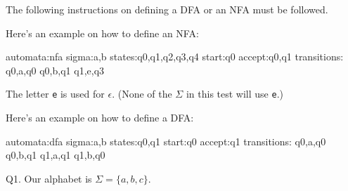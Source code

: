 



\renewcommand\TITLE{Test 1 Part A}

\renewcommand\AUTHOR{John Doe}
\renewcommand\EMAIL{jdoe@jdoe.com}
\newcommand\tf{T or F or M: }


\topmatter

The following instructions on defining a DFA or an NFA
must be followed.

Here's an example on how to define an NFA:
\begin{console}
automata:nfa
sigma:a,b
states:q0,q1,q2,q3,q4
start:q0
accept:q0,q1
transitions:
q0,a,q0
q0,b,q1
q1,e,q3
\end{console}
The letter \verb!e! is used for $\epsilon$.
(None of the $\Sigma$ in this test will use \verb!e!.)

Here's an example on how to define a DFA:
\begin{console}
automata:dfa
sigma:a,b
states:q0,q1
start:q0
accept:q1
transitions:
q0,a,q0
q0,b,q1
q1,a,q1
q1,b,q0
\end{console}




\newpage

Q1. Our alphabet is $\Sigma = \{a, b, c\}$.

